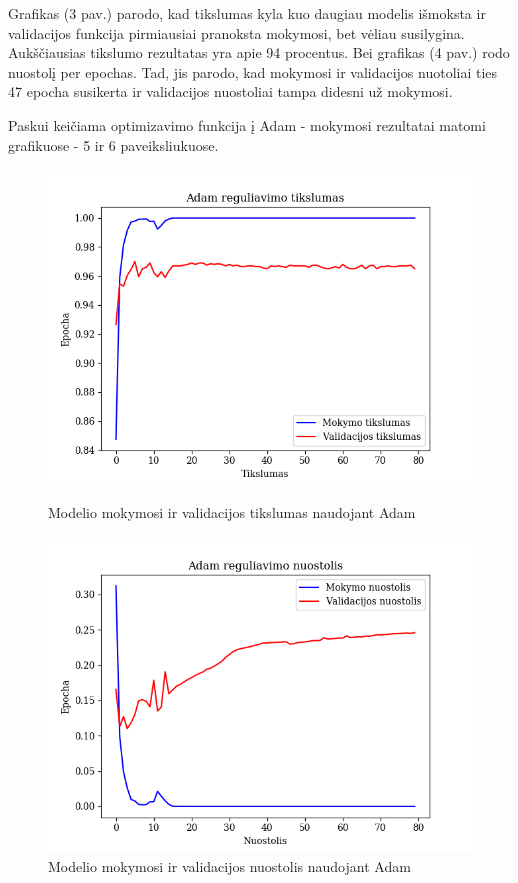 \documentclass{VUMIFPSkursinis}
\begin{document}
Grafikas (3 pav.) parodo, kad tikslumas kyla kuo daugiau modelis išmoksta ir validacijos funkcija pirmiausiai pranoksta mokymosi, bet vėliau susilygina. Aukščiausias tikslumo rezultatas yra apie 94 procentus.
Bei grafikas (4 pav.) rodo nuostolį per epochas. Tad, jis parodo, kad mokymosi ir validacijos nuotoliai ties 47 epocha susikerta ir validacijos nuostoliai tampa didesni už mokymosi.

Paskui keičiama optimizavimo funkcija į Adam - mokymosi rezultatai matomi grafikuose - 5 ir 6 paveiksliukuose.

\begin{figure}[!htbp]
  \centering
  \begin{minipage}[b]{0.49\textwidth}
    \includegraphics[width=\textwidth]{img/FT/Adam_acc.png}
    \caption{Modelio mokymosi ir validacijos tikslumas naudojant Adam}
  \end{minipage}
  \begin{minipage}[b]{0.49\textwidth}
    \includegraphics[width=\textwidth]{img/FT/Adam_loss.png}
    \caption{Modelio mokymosi ir validacijos nuostolis naudojant Adam}
  \end{minipage}
\end{figure}
\end{document}
